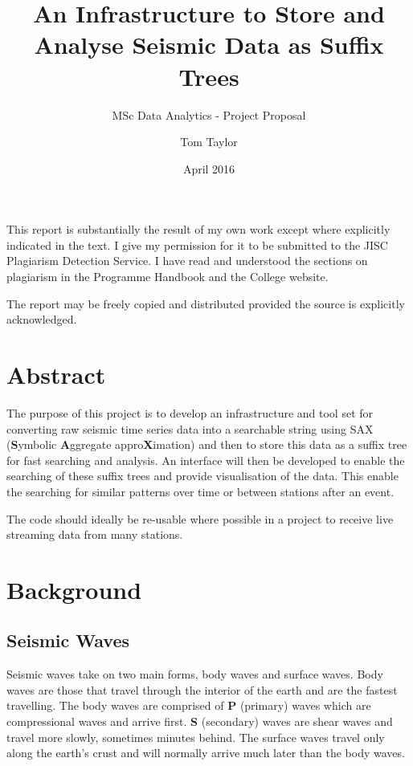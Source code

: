 \documentclass[11pt]{scrartcl}
\title{An Infrastructure to Store and Analyse Seismic Data as Suffix Trees}
\subtitle{MSc Data Analytics - Project Proposal}
\date{April 2016}
\author{Tom Taylor}
\begin{document}
\maketitle
\begin{itshape}
	\noindent This report is substantially the result of my own work except where explicitly
	indicated in the text. I give my permission for it to be submitted to the JISC
	Plagiarism Detection Service. I have read and understood the sections on plagiarism
	in the Programme Handbook and the College website.
	
	\noindent The report may be freely copied and distributed provided the source is explicitly
	acknowledged.
\end{itshape}

\tableofcontents

\newpage

\section{Abstract}
	The purpose of this project is to develop an infrastructure and tool set for converting raw seismic time series data into a searchable string using SAX (\textbf{S}ymbolic \textbf{A}ggregate appro\textbf{X}imation) and then to store this data as a suffix tree for fast searching and analysis.  An interface will then be developed to enable the searching of these suffix trees and provide visualisation of the data.  This enable the searching for similar patterns over time or between stations after an event.
	
	The code should ideally be re-usable where possible in a project to receive live streaming data from many stations.
	
\section{Background}
\subsection{Seismic Waves}
	Seismic waves take on two main forms, body waves and surface waves.  Body waves are those that travel through the interior of the earth and are the fastest travelling.  The body waves are comprised of \textbf{P} (primary) waves which are compressional waves and arrive first.  \textbf{S} (secondary) waves are shear waves and travel more slowly, sometimes minutes behind.  The surface waves travel only along the earth's crust and will normally arrive much later than the body waves.
	
\end{document}
